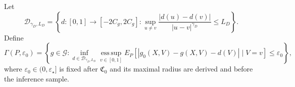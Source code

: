 Let
\[
 \mathcal D_{\gamma_D,L_D}
 =\left\{d:[0,1]\to[-2C_g,2C_g]:
 \sup_{u\ne v}\frac{|d(u)-d(v)|}{|u-v|^{\gamma_D}}\le L_D\right\}.
\]
Define
\[
 \Gamma(P,\varepsilon_0)
 =\left\{g\in\mathcal G:
 \inf_{d\in\mathcal D_{\gamma_D,L_D}}
 \operatorname*{ess\,sup}_{v\in[0,1]}
 E_P[|g_0(X,V)-g(X,V)-d(V)|\mid V=v]
 \le\varepsilon_0\right\},
\]
where \(\varepsilon_0\in(0,\varepsilon_\star]\) is fixed after \(\mathfrak C_0\) and its maximal radius are derived and before the inference sample.